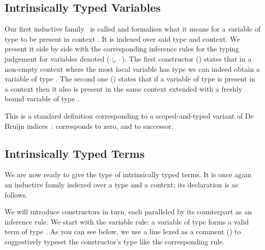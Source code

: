 \begin{AgdaSuppressSpace}
\end{AgdaSuppressSpace}

\subsection{Intrinsically Typed Variables}

Our first inductive family~\cite{DBLP:journals/fac/Dybjer94}
is called  and formalises
what it means for a variable of type  to be present in context .
It is indexed over said type and context.
We present it side by side
with the corresponding inference rules for the typing judgement
for variables denoted ($\cdot :_v \cdot$).
%
The first constructor () states that in a non-empty context
where the most local variable has type  we can indeed obtain a
variable of type .
%
The second one () states that if a variable of type 
is present in a context then it also is present in the same context
extended with a freshly bound variable of type .



This is a standard definition
corresponding to a scoped-and-typed variant of De Bruijn
indices~\cite{de1972lambda,DBLP:journals/scp/BellegardeH94,DBLP:conf/csl/AltenkirchR99,DBLP:journals/jfp/BirdP99}:
 corresponds to zero, and  to successor.

\subsection{Intrinsically Typed Terms}

We are now ready to give the type of intrinsically typed terms.
It is once again an inductive family indexed over a type and a
context; its declaration is as follows.


We will introduce constructors in turn, each paralleled by its
counterpart as an inference rule.
%
We start with the variable rule: a variable of type 
forms a valid term of type .
%
As you can see below, we use a line lexed as a comment (\AC{----})
to suggestively typeset the constructor's type like the
corresponding rule.

